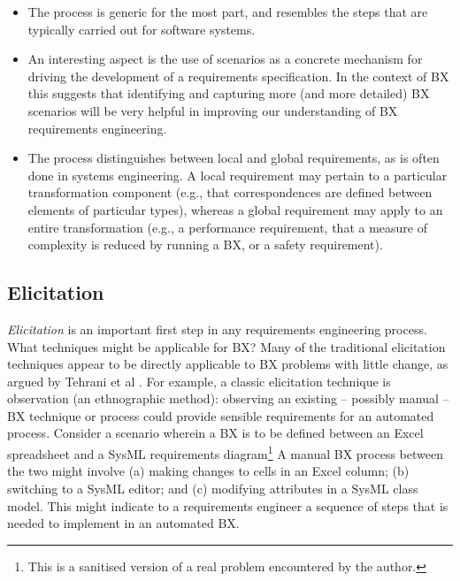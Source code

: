 \begin{itemize}
\item The process is generic for the most part, and resembles the steps that are typically carried out for software systems.

\item An interesting aspect is the use of scenarios as a concrete mechanism for driving the development of a requirements specification. In the context of BX this suggests that identifying and capturing more (and more detailed) BX scenarios will be very helpful in improving our understanding of BX requirements engineering.

\item The process distinguishes between local and global requirements, as is often done in systems engineering. A local requirement may pertain to a particular transformation component (e.g., that correspondences are defined between elements of particular types), whereas a global requirement may apply to an entire transformation (e.g., a performance requirement, that a measure of complexity is reduced by running a BX, or a safety requirement).
\end{itemize}

\subsection{Elicitation}
\textit{Elicitation} is an important first step in any requirements engineering process. What techniques might be applicable for BX? Many of the traditional elicitation techniques appear to be directly applicable to BX problems with little change, as argued by Tehrani et al \cite{TehraniZL16}. For example, a classic elicitation technique is observation (an ethnographic method): observing an existing -- possibly manual -- BX technique or process could provide sensible requirements for an automated process. Consider a scenario wherein a BX is to be defined between an Excel spreadsheet and a SysML requirements diagram\footnote{This is a sanitised version of a real problem encountered by the author.} A manual BX process between the two might involve (a) making changes to cells in an Excel column; (b) switching to a SysML editor; and (c) modifying attributes in a SysML class model. This might indicate to a requirements engineer a sequence of steps that is needed to implement in an automated BX.

